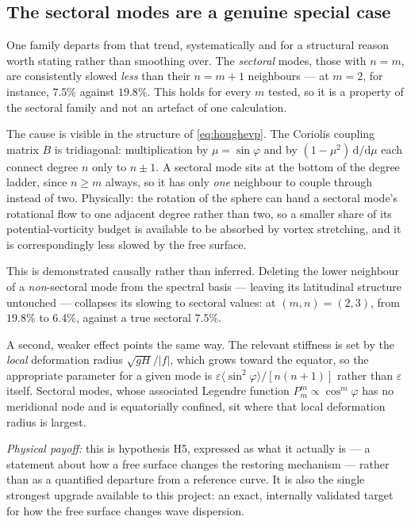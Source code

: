 \documentclass[11pt,a4paper]{article}
\newcommand{\dd}{\mathrm{d}}
\begin{document}
\subsection{The sectoral modes are a genuine special case}
\label{sec:hough:sectoral}

One family departs from that trend, systematically and for a structural reason
worth stating rather than smoothing over. The \emph{sectoral} modes, those with
$n = m$, are consistently slowed \emph{less} than their $n = m+1$ neighbours ---
at $m=2$, for instance, $7.5\%$ against $19.8\%$. This holds for every $m$
tested, so it is a property of the sectoral family and not an artefact of one
calculation.

The cause is visible in the structure of \eqref{eq:houghevp}. The Coriolis
coupling matrix $B$ is tridiagonal: multiplication by $\mu = \sin\varphi$ and by
$(1-\mu^2)\,\dd/\dd\mu$ each connect degree $n$ only to $n\pm1$. A sectoral mode
sits at the bottom of the degree ladder, since $n \ge m$ always, so it has only
\emph{one} neighbour to couple through instead of two. Physically: the rotation
of the sphere can hand a sectoral mode's rotational flow to one adjacent degree
rather than two, so a smaller share of its potential-vorticity budget is
available to be absorbed by vortex stretching, and it is correspondingly less
slowed by the free surface.

This is demonstrated causally rather than inferred. Deleting the lower
neighbour of a \emph{non}-sectoral mode from the spectral basis --- leaving its
latitudinal structure untouched --- collapses its slowing to sectoral values: at
$(m,n) = (2,3)$, from $19.8\%$ to $6.4\%$, against a true sectoral $7.5\%$.

A second, weaker effect points the same way. The relevant stiffness is set by
the \emph{local} deformation radius $\sqrt{gH}/|f|$, which grows toward the
equator, so the appropriate parameter for a given mode is
$\varepsilon\langle\sin^2\!\varphi\rangle/[n(n+1)]$ rather than $\varepsilon$
itself. Sectoral modes, whose associated Legendre function
$P_m^m \propto \cos^m\!\varphi$ has no meridional node and is equatorially
confined, sit where that local deformation radius is largest.

\medskip
\noindent\emph{Physical payoff:} this is hypothesis H5, expressed as what it
actually is --- a statement about how a free surface changes the restoring
mechanism --- rather than as a quantified departure from a reference curve. It
is also the single strongest upgrade available to this project: an exact,
internally validated target for how the free surface changes wave dispersion.
\end{document}

